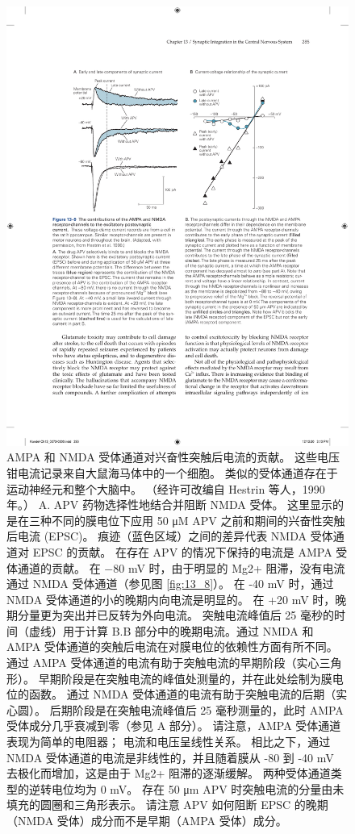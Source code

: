 \begin{figure}[htbp]
	\centering
	\includegraphics[width=0.75\linewidth]{chap13/fig_13_9}
	\caption{AMPA 和 NMDA 受体通道对兴奋性突触后电流的贡献。 这些电压钳电流记录来自大鼠海马体中的一个细胞。 类似的受体通道存在于运动神经元和整个大脑中。 （经许可改编自 Hestrin 等人，1990 年。） A. APV 药物选择性地结合并阻断 NMDA 受体。 这里显示的是在三种不同的膜电位下应用 50 μM APV 之前和期间的兴奋性突触后电流 (EPSC)。 痕迹（蓝色区域）之间的差异代表 NMDA 受体通道对 EPSC 的贡献。 在存在 APV 的情况下保持的电流是 AMPA 受体通道的贡献。 在 −80 mV 时，由于明显的 Mg2+ 阻滞，没有电流通过 NMDA 受体通道（参见图 \ref{fig:13_8}）。 在 -40 mV 时，通过 NMDA 受体通道的小的晚期内向电流是明显的。 在 +20 mV 时，晚期分量更为突出并已反转为外向电流。 突触电流峰值后 25 毫秒的时间（虚线）用于计算 B.B 部分中的晚期电流。通过 NMDA 和 AMPA 受体通道的突触后电流在对膜电位的依赖性方面有所不同。 通过 AMPA 受体通道的电流有助于突触电流的早期阶段（实心三角形）。 早期阶段是在突触电流的峰值处测量的，并在此处绘制为膜电位的函数。 通过 NMDA 受体通道的电流有助于突触电流的后期（实心圆）。 后期阶段是在突触电流峰值后 25 毫秒测量的，此时 AMPA 受体成分几乎衰减到零（参见 A 部分）。 请注意，AMPA 受体通道表现为简单的电阻器； 电流和电压呈线性关系。 相比之下，通过 NMDA 受体通道的电流是非线性的，并且随着膜从 -80 到 -40 mV 去极化而增加，这是由于 Mg2+ 阻滞的逐渐缓解。 两种受体通道类型的逆转电位均为 0 mV。 存在 50 μm APV 时突触电流的分量由未填充的圆圈和三角形表示。 请注意 APV 如何阻断 EPSC 的晚期（NMDA 受体）成分而不是早期（AMPA 受体）成分。}
	\label{fig:13_9}
\end{figure}


